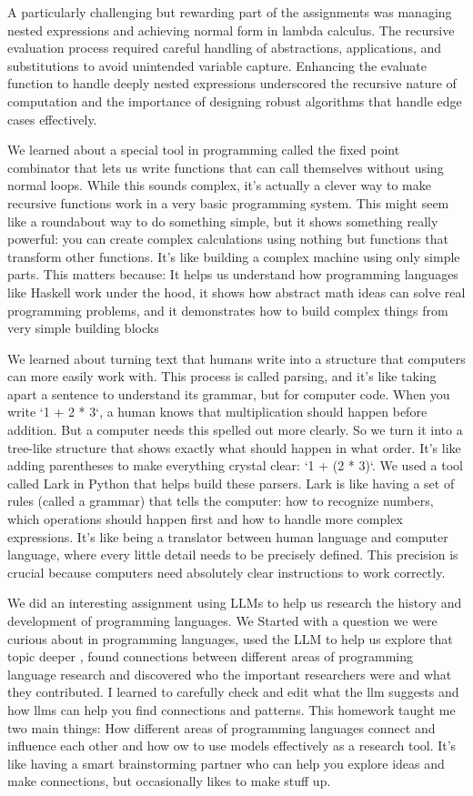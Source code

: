 \documentclass{article}
\theoremstyle{theorem}
\theoremstyle{definition}
\theoremstyle{remark}
\begin{document}
A particularly challenging but rewarding part of the assignments was managing nested expressions and achieving 
normal form in lambda calculus. The recursive evaluation process required careful handling of abstractions, 
applications, and substitutions to avoid unintended variable capture. Enhancing the evaluate function to 
handle deeply nested expressions underscored the recursive nature of computation and the importance of 
designing robust algorithms that handle edge cases effectively.

We learned about a special tool in programming called the fixed point combinator that lets us write functions that 
can call themselves without using normal loops. While this sounds complex, it's actually a clever way to make recursive 
functions work in a very basic programming system. This might seem like a roundabout way to do something simple, but it 
shows something really powerful: you can create complex calculations using nothing but functions that transform other 
functions. It's like building a complex machine using only simple parts. This matters because: It helps us understand how 
programming languages like Haskell work under the hood, it shows how abstract math ideas can solve real programming problems, and
it demonstrates how to build complex things from very simple building blocks

We learned about turning text that humans write into a structure that computers can more easily work with. This process is called parsing, 
and it's like taking apart a sentence to understand its grammar, but for computer code. When you write `1 + 2 * 3`, a human knows that 
multiplication should happen before addition. But a computer needs this spelled out more clearly. So we turn it into a tree-like structure 
that shows exactly what should happen in what order. It's like adding parentheses to make everything crystal clear: `1 + (2 * 3)`.
We used a tool called Lark in Python that helps build these parsers. Lark is like having a set of rules (called a grammar) that tells the computer: 
how to recognize numbers, which operations should happen first and how to handle more complex expressions. It's like being a translator between 
human language and computer language, where every little detail needs to be precisely defined. This precision is crucial because computers 
need absolutely clear instructions to work correctly.


We did an interesting assignment using LLMs to help us research the history and development of programming languages. 
We Started with a question we were curious about in programming languages, used the LLM to help us explore that topic deeper
, found connections between different areas of programming language research and discovered who the important researchers were and 
what they contributed. I learned to carefully check and edit what the llm suggests and how llms can help you find connections and patterns. 
This homework taught me two main things: How different areas of programming languages connect and influence each other
and how ow to use models effectively as a research tool. It's like having a smart brainstorming partner who can help you explore ideas and 
make connections, but occasionally likes to make stuff up. 
\end{document}
